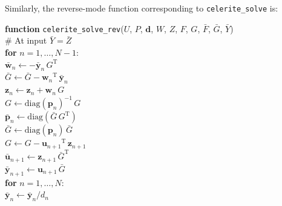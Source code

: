 \documentclass[rnaas]{aastex62}
\newcommand{\T}{\ensuremath{\mathrm{T}}}
\newcommand{\bvec}[1]{{\ensuremath{\boldsymbol{#1}}}}
\begin{document}
\noindent Similarly, the reverse-mode function corresponding to
\texttt{celerite\_solve} is:

\medskip
\begin{minipage}{\linewidth}
\textbf{function} \texttt{celerite\_solve\_rev}($U$, $P$, $\bvec{d}$, $W$,
    $Z$, $F$, $G$, $\bar{F}$, $\bar{G}$, $\bar{Y}$) \\
\hspace*{2em}\textsf{\# At input $\bar{Y} = \bar{Z}$}\\
\hspace*{2em}\textbf{for} $n = 1,\ldots,N-1$:\\
\hspace*{2em}\hspace*{2em}$\bar{\bvec{w}}_n \gets
    - \bar{\bvec{y}}_n\,G^\T$\\
\hspace*{2em}\hspace*{2em}$\bar{G} \gets \bar{G} - {\bvec{w}_n}^\T \,
    \bar{\bvec{y}}_n$\\
\hspace*{2em}\hspace*{2em}$\bvec{z}_n \gets \bvec{z}_n + \bvec{w}_n\,G$\\
\hspace*{2em}\hspace*{2em}$G \gets \mathrm{diag}(\bvec{p}_n)^{-1}\,G$\\
\hspace*{2em}\hspace*{2em}$\bar{\bvec{p}}_n \gets \mathrm{diag}(
    \bar{G}\,G^\T)$\\
\hspace*{2em}\hspace*{2em}$\bar{G} \gets
    \mathrm{diag}(\bvec{p}_n)\,\bar{G}$\\
\hspace*{2em}\hspace*{2em}$G \gets G - {\bvec{u}_{n+1}}^\T\,\bvec{z}_{n+1}$\\
\hspace*{2em}\hspace*{2em}$\bar{\bvec{u}}_{n+1} \gets
    \bvec{z}_{n+1}\,\bar{G}^\T$\\
\hspace*{2em}\hspace*{2em}$\bar{\bvec{y}}_{n+1} \gets
    \bvec{u}_{n+1}\,\bar{G}$\\
\hspace*{2em}\textbf{for} $n = 1,\ldots,N$:\\
\hspace*{2em}\hspace*{2em}$\bar{\bvec{y}}_n \gets \bar{\bvec{y}}_n/d_n$\\

\end{minipage}
\end{document}
